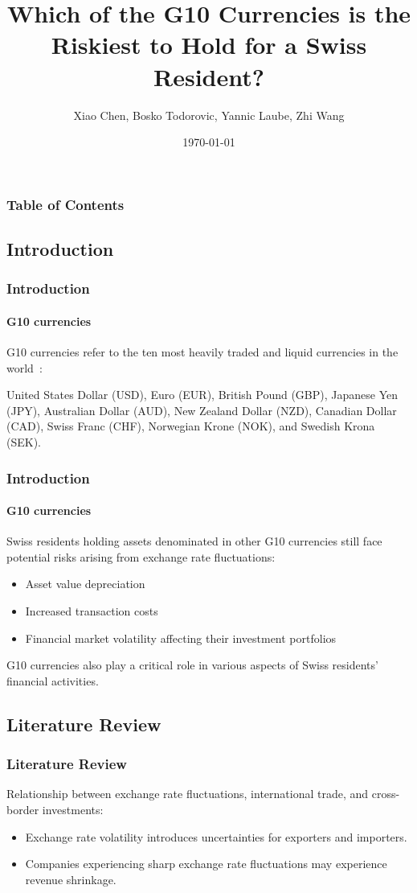 \documentclass[10pt]{beamer}
\author{Xiao Chen, Bosko Todorovic, Yannic Laube, Zhi Wang}
\title{Which of the G10 Currencies is the Riskiest to Hold for a Swiss Resident?}
\institute{University of Zurich}
\date{\today}
\begin{document}
\begin{frame}
\titlepage
\end{frame}
\begin{frame}
\frametitle{Table of Contents}
\tableofcontents
\end{frame}
\begin{frame}
\section{Introduction}
\frametitle{Introduction}
\framesubtitle{G10 currencies}
G10 currencies refer to the ten most heavily traded and liquid currencies in the world~\cite{bis2022report}: 

United States Dollar (USD), Euro (EUR), British Pound (GBP), Japanese Yen (JPY), Australian Dollar (AUD), New Zealand Dollar (NZD), Canadian Dollar (CAD), Swiss Franc (CHF), Norwegian Krone (NOK), and Swedish Krona (SEK).

\end{frame}
\begin{frame}
\frametitle{Introduction}
\framesubtitle{G10 currencies}
Swiss residents holding assets denominated in other G10
currencies still face potential risks arising from exchange rate fluctuations:
\begin{itemize}
    \item Asset value depreciation
    \item Increased transaction costs
    \item Financial market volatility affecting their investment portfolios
\end{itemize}

G10 currencies also play a critical role in various aspects of Swiss residents’ financial activities.
\end{frame}
\begin{frame}
\section{Literature Review}
\frametitle{Literature Review}
Relationship between exchange rate fluctuations, international trade, and cross-border investments:~\cite{AUBOIN_RUTA_2013}
\begin{itemize}
    \item Exchange rate volatility introduces uncertainties for exporters and importers.
    \item Companies experiencing sharp exchange rate fluctuations may experience revenue shrinkage.
\end{itemize}
\end{frame}
\end{document}
